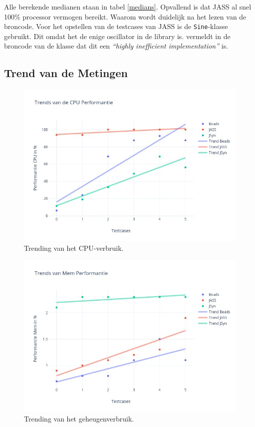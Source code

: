Alle berekende medianen staan in tabel \ref{medians}. Opvallend is dat JASS al snel 100\% processor vermogen bereikt. Waarom wordt duidelijk na het lezen van de broncode. Voor het opstellen van de testcases van JASS is de \verb+Sine+-klasse gebruikt. Dit omdat het de enige oscillator in de library is. \textcite{jasscode} vermeldt in de broncode van de klasse dat dit een \textit{``highly inefficient implementation''} is.

\subsection{Trend van de Metingen}

\begin{figure}
    		\centering
    		\includegraphics[width=0.75\linewidth]{medians/trendcpu}
    		\caption{Trending van het CPU-verbruik.}
    		\label{trendcpu}
\end{figure}

\begin{figure}
    		\centering
    		\includegraphics[width=0.75\linewidth]{medians/trendmem}
    		\caption{Trending van het geheugenverbruik.}
    		\label{trendmem}
\end{figure}

